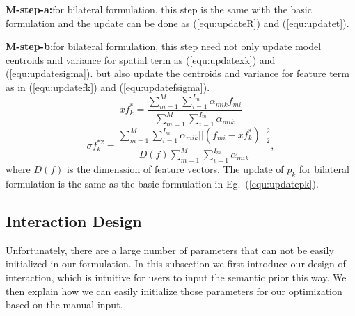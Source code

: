 \textbf{M-step-a:}for bilateral formulation, this step is the same with the basic formulation and the update can be done as (\ref{equ:updateR}) and (\ref{equ:updatet}).

\textbf{M-step-b}:for bilateral formulation, this step need not only update model centroids and variance for spatial term as (\ref{equ:updatexk}) and (\ref{equ:updatesigma}).
but also update the centroids and variance for feature term as in (\ref{equ:updatefk}) and (\ref{equ:updatefsigma}).
\begin{equation}
\label{equ:updatefk}
xf_k^*=\frac{\sum_{m=1}^M\sum_{i=1}^{I_m}\alpha_{mik}f_{mi}}{\sum_{m=1}^M\sum_{i=1}^{I_m}\alpha_{mik}}
\end{equation}
\begin{equation}
\label{equ:updatefsigma}
\sigma f_k^{*2}=\frac{\sum_{m=1}^M\sum_{i=1}^{I_m}\alpha_{mik}||(f_{mi}-xf_k^*)||_2^2}{D(f)\sum_{m=1}^M\sum_{i=1}^{I_m}\alpha_{mik}},
\end{equation}
where $D(f)$ is the dimenssion of feature vectors. The update of $p_k$ for bilateral formulation is the same as the basic formulation in Eg.~(\ref{equ:updatepk}).

\subsection{Interaction Design}
\label{sec:imp:interact}
Unfortunately, there are a large number of parameters that can not be easily initialized in our formulation. 
%
In this subsection we first introduce our design of interaction, which is intuitive for users to input the semantic prior this way. We then explain how we can easily initialize those parameters for our optimization based on the manual input.


